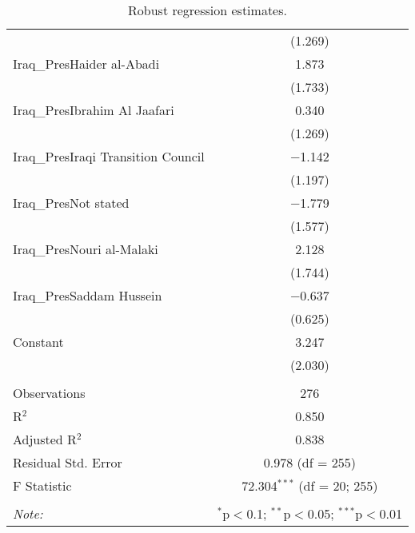 \begin{table}[ht]
\begin{adjustbox}{width=1\textwidth}
\begin{tabular}{@{\extracolsep{5pt}}lc}
  & (1.269) \\
 Iraq\_PresHaider al-Abadi & 1.873 \\ 
  & (1.733) \\
 Iraq\_PresIbrahim Al Jaafari & 0.340 \\ 
  & (1.269) \\
 Iraq\_PresIraqi Transition Council & $-$1.142 \\ 
  & (1.197) \\
 Iraq\_PresNot stated & $-$1.779 \\ 
  & (1.577) \\
 Iraq\_PresNouri al-Malaki & 2.128 \\ 
  & (1.744) \\
 Iraq\_PresSaddam Hussein & $-$0.637 \\ 
  & (0.625) \\
 Constant & 3.247 \\ 
  & (2.030) \\
\hline \\[-1.8ex] 
Observations & 276 \\ 
R$^{2}$ & 0.850 \\ 
Adjusted R$^{2}$ & 0.838 \\ 
Residual Std. Error & 0.978 (df = 255) \\ 
F Statistic & 72.304$^{***}$ (df = 20; 255) \\ 
\hline 
\hline \\[-1.8ex] 
\textit{Note:}  & \multicolumn{1}{r}{$^{*}$p$<$0.1; $^{**}$p$<$0.05; $^{***}$p$<$0.01} \\ 
\end{tabular}
\end{adjustbox}
\caption{Robust regression estimates.}  
\end{table} 

